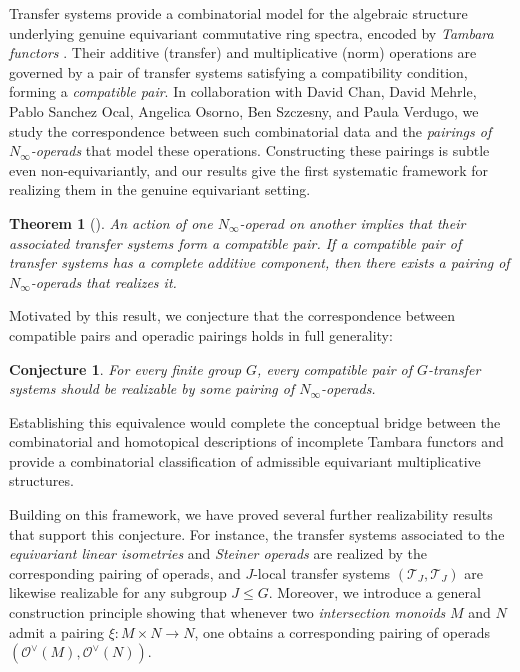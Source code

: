\documentclass[11pt]{article}
\newtheorem{theorem}{Theorem}
\newtheorem*{conjecture}{Conjecture}
\begin{document}
Transfer systems provide a combinatorial model for the algebraic structure underlying genuine equivariant commutative ring spectra, encoded by {\it Tambara functors} \cite{MR1209937}.
Their additive (transfer) and multiplicative (norm) operations are governed by a pair of transfer systems satisfying a compatibility condition, forming a {\it compatible pair}.
In collaboration with David Chan, David Mehrle, Pablo Sanchez Ocal, Angelica Osorno, Ben Szczesny, and Paula Verdugo, we study the correspondence between such combinatorial data and the {\it pairings of $N_\infty$-operads} \cite{MR2544392} that model these operations.
Constructing these pairings is subtle even non-equivariantly, and our results give the first systematic framework for realizing them in the genuine equivariant setting.

\begin{theorem}[\cite{CCM+}]
An action of one $N_\infty$-operad on another implies that their associated transfer systems form a compatible pair.
If a compatible pair of transfer systems has a complete additive component, then there exists a pairing of $N_\infty$-operads that realizes it.
\end{theorem}

Motivated by this result, we conjecture that the correspondence between compatible pairs and operadic pairings holds in full generality:
\begin{conjecture}
 For every finite group $G$, every compatible pair of $G$-transfer systems should be realizable by some pairing of $N_\infty$-operads.
\end{conjecture}

Establishing this equivalence would complete the conceptual bridge between the combinatorial and homotopical descriptions of incomplete Tambara functors and provide a combinatorial classification of admissible equivariant multiplicative structures.


Building on this framework, we have proved several further realizability results that support this conjecture.
For instance, the transfer systems associated to the {\it equivariant linear isometries} and {\it Steiner operads} are realized by the corresponding pairing of operads, and $J$-local transfer systems $(\mathcal{T}_J,\mathcal{T}_J)$ are likewise realizable for any subgroup $J\le G$.
Moreover, we introduce a general construction principle showing that whenever two {\it intersection monoids} $M$ and $N$ admit a pairing $\xi\colon M\times N\to N$, one obtains a corresponding pairing of operads $(\mathcal{O}^{\vee}(M),\mathcal{O}^{\vee}(N))$.
\end{document}
